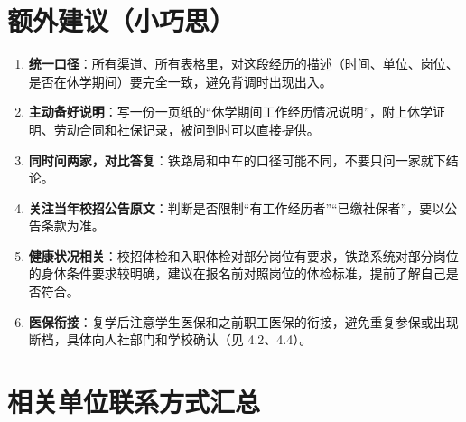 \documentclass[UTF8,fontset=fandol,zihao=-4]{ctexart}
\begin{document}
\section{额外建议（小巧思）}

\begin{enumerate}
  \item \textbf{统一口径}：所有渠道、所有表格里，对这段经历的描述（时间、单位、岗位、是否在休学期间）要完全一致，避免背调时出现出入。
  \item \textbf{主动备好说明}：写一份一页纸的“休学期间工作经历情况说明”，附上休学证明、劳动合同和社保记录，被问到时可以直接提供。
  \item \textbf{同时问两家，对比答复}：铁路局和中车的口径可能不同，不要只问一家就下结论。
  \item \textbf{关注当年校招公告原文}：判断是否限制“有工作经历者”“已缴社保者”，要以公告条款为准。
  \item \textbf{健康状况相关}：校招体检和入职体检对部分岗位有要求，铁路系统对部分岗位的身体条件要求较明确，建议在报名前对照岗位的体检标准，提前了解自己是否符合。
  \item \textbf{医保衔接}：复学后注意学生医保和之前职工医保的衔接，避免重复参保或出现断档，具体向人社部门和学校确认（见 4.2、4.4）。
\end{enumerate}

\section{相关单位联系方式汇总}
\end{document}

